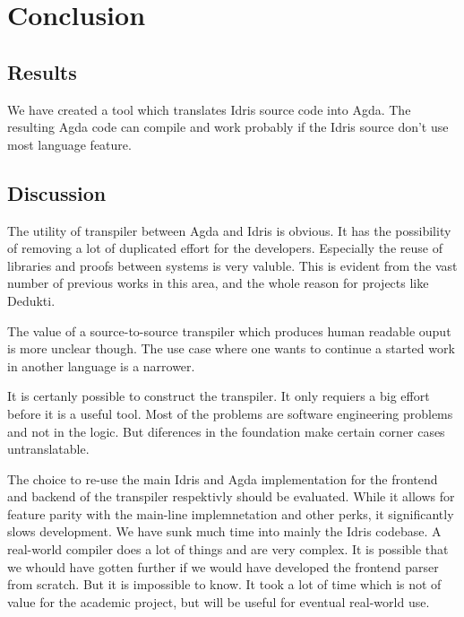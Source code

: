 \chapter{Conclusion}





\section{Results}

We have created a tool which translates Idris source code into Agda. The
resulting Agda code can compile and work probably if the Idris source don't use
most language feature.

\section{Discussion}
The utility of transpiler between Agda and Idris is obvious. It has the
possibility of removing a lot of duplicated effort for the developers.
Especially the reuse of libraries and proofs between systems is very valuble.
This is evident from the vast number of previous works in this area, and the
whole reason for projects like Dedukti.~\cite{assaf2016dedukti}

The value of a source-to-source transpiler which produces human readable ouput
is more unclear though. The use case where one wants to continue a started work
in another language is a narrower.

It is certanly possible to construct the transpiler. It only requiers a big
effort before it is a useful tool. Most of the problems are software
engineering problems and not in the logic. But diferences in the foundation
make certain corner cases untranslatable.

The choice to re-use the main Idris and Agda implementation for the frontend
and backend of the transpiler respektivly should be evaluated. While it allows
for feature parity with the main-line implemnetation and other perks, it
significantly slows development. We have sunk much time into mainly the Idris
codebase. A real-world compiler does a lot of things and are very
complex. It is possible that we
whould have gotten further if we would have developed the frontend parser from
scratch. But it is impossible to know. It took a lot of time which is not of
value for the academic project, but will be useful for eventual real-world use.


